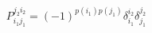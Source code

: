\begin{equation}
P_{i_1j_1}^{j_2i_2}=(-1)^{p(i_1)p(j_1)}\delta_{i_1}^{i_2}\delta_{j_1}^{j_2}
\end{equation}

